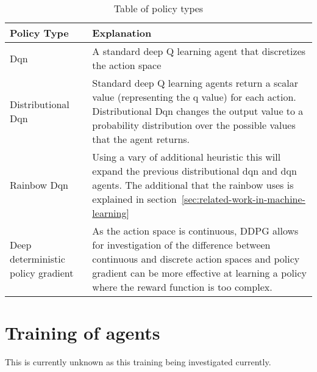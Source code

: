 \begin{table}
    \centering
    \begin{tabular}{|l|l|} \hline
        Policy Type & Explanation \\ \hline
        Dqn~\citep{mnih2015humanlevel} & A standard deep Q learning agent that discretizes the action space \\ \hline
        Distributional Dqn~\citep{distributional_dqn} & Standard deep Q learning agents return a scalar value
            (representing the q value) for each action. Distributional Dqn changes the output value to a probability
            distribution over the possible values that the agent returns. \\ \hline
        Rainbow Dqn~\citep{rainbow} & Using a vary of additional heuristic this will expand the previous distributional
            dqn and dqn agents. The additional that the rainbow uses is explained in
            section~\ref{sec:related-work-in-machine-learning}\\ \hline
        Deep deterministic policy gradient~\citep{ddpg} & As the action space is continuous, DDPG allows for
            investigation of the difference between continuous and discrete action spaces and policy gradient can be
            more effective at learning a policy where the reward function is too complex. \\ \hline
    \end{tabular}
    \caption{Table of policy types}
    \label{tab:reinforcement_learning_policies}
\end{table}


\section{Training of agents}\label{sec:training-of-agents}
This is currently unknown as this training being investigated currently.
